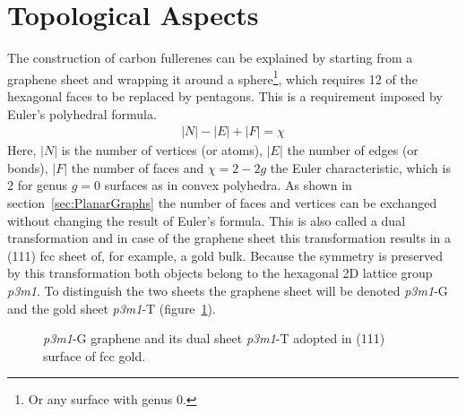 \section{\label{sec:TopAsp}Topological Aspects}

The construction of carbon fullerenes can be explained by starting from a
graphene sheet and wrapping it around a sphere\footnote{Or any surface with
genus 0.}, which requires 12 of the hexagonal faces to be replaced by pentagons. This is a requirement imposed by Euler's polyhedral formula.
%
\begin{align}
    |N|-|E|+|F|=\chi
\end{align}
%
Here, $|N|$ is the number of vertices (or atoms), $|E|$ the number of edges (or
bonds), $|F|$ the number of faces and $\chi=2-2g$ the Euler characteristic,
which is $2$ for genus $g=0$ surfaces as in convex polyhedra. As shown in
section~\ref{sec:PlanarGraphs} the number of faces and vertices can be exchanged
without changing the result of Euler's formula. This is also called a dual
transformation and in case of the graphene sheet this transformation results in
a (111) \ac{fcc} sheet of, for example, a gold bulk. Because the symmetry is
preserved by this transformation both objects belong to the hexagonal 2D lattice
group \textit{p3m1}. To distinguish the two sheets the graphene sheet will be
denoted \textit{p3m1}-G and the gold sheet \textit{p3m1}-T (figure~\ref{fig:graphenedual}).

\begin{figure}[htb]
    \begin{center}
        \hspace{.05\textwidth}
        \caption{\protect{} \textit{p3m1}-G graphene and
        \protect{} its dual sheet \textit{p3m1}-T adopted in (111)
        surface of fcc gold.}
    \label{fig:graphenedual}
    \end{center}
\end{figure}

